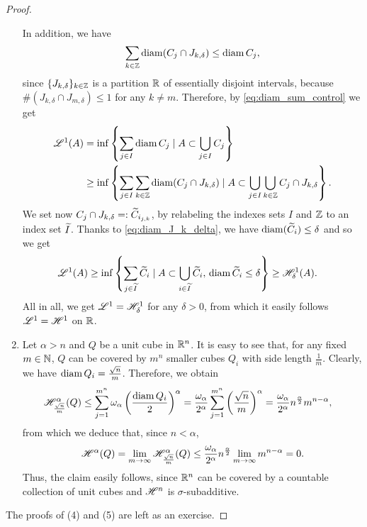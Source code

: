 \begin{proof}
\begin{enumerate}[(1)]
In addition, we have 
\begin{equation} \label{eq:diam_sum_control}
\sum_{k\in\mathbb{Z}} \operatorname{diam}(C_j \cap J_{k,\delta}) \leq \operatorname{diam} C_j,
\end{equation}
since $\{J_{k,\delta}\}_{k \in \mathbb{Z}}$ is a partition $\mathbb{R}$ of essentially disjoint intervals, because $\# (J_{k, \delta} \cap J_{m, \delta}) \le 1$ for any $k \neq m$. Therefore, by \eqref{eq:diam_sum_control} we get
\begin{align*}
\mathscr{L}^{1}(A) & = \inf \left\{ \sum_{j\in I} \operatorname{diam} C_j \mid A \subset
\bigcup_{j\in I} C_j \right\} \\
& \geq \inf \left\{ \sum_{j\in I} \sum_{k\in\mathbb{Z}} \operatorname{diam} (C_j \cap J_{k,\delta}) \mid A \subset
\bigcup_{j\in I} \bigcup_{k\in\mathbb{Z}} C_j\cap J_{k,\delta} \right\}.
\end{align*}
We set now $C_{j} \cap J_{k, \delta} =: \widetilde{ C}_{i_{j, k}}$, by relabeling the indexes sets $I$ and $\mathbb{Z}$ to an index set $\widetilde{ I}$. Thanks to \eqref{eq:diam_J_k_delta}, we have $\operatorname{diam}(\widetilde{ C}_{i}) \le \delta$ and so we get
\begin{align*}
\mathscr{L}^{1}(A) & \ge \inf \left\{ \sum_{j \in \widetilde{ I}} \widetilde{ C}_{i} \mid A \subset \bigcup_{i \in \widetilde{ I}} \widetilde{ C}_{i},\, \operatorname{diam} \widetilde{ C}_i \leq \delta \right\} \geq \mathscr{H}^{1}_\delta(A).
\end{align*}
All in all, we get $\mathscr{L}^{1} = \mathscr{H}^{1}_{\delta}$ for any $\delta > 0$, from which it easily follows $\mathscr{L}^{1} = \mathscr{H}^{1}$ on $\mathbb{R}$.
\item Let $\alpha > n$ and $Q$ be a unit cube in $\mathbb{R}^n$. It is easy to see that, for any fixed $m\in \mathbb{N}$, $Q$ can be covered by $m^{n}$ smaller cubes $Q_i$ with side length $\frac{1}{m}$. Clearly, we have $\operatorname{diam} Q_i
= \frac{\sqrt{n}}{m}$. Therefore, we obtain 
\[
\begin{aligned}
\mathscr{H}^{\alpha}_{\frac{\sqrt{n}}{m}} (Q) 
& \leq \sum_{j=1}^{m^n} \omega_\alpha \left(\frac{\operatorname{diam} Q_i}{2}\right)^\alpha
= \frac{\omega_\alpha}{2^\alpha} \sum_{j=1}^{m^n}
\left(\frac{\sqrt{n}}{m}\right)^\alpha = \frac{\omega_\alpha}{2^\alpha}
n^{\frac{\alpha}{2}} m^{n-\alpha},
\end{aligned}
\]
from which we deduce that, since $n < \alpha$,
\[
\begin{aligned}
\mathscr{H}^{\alpha} (Q) = \lim_{m\to \infty} \mathscr{H}^{\alpha}_{\frac{\sqrt{n}}{m}} (Q) 
\le \frac{\omega_\alpha}{2^\alpha} n^{\frac{\alpha}{2}}
\lim_{m\to \infty} m^{n-\alpha}
= 0.
\end{aligned}
\]
Thus, the claim easily follows, since $\mathbb{R}^n$ can be covered by a countable collection of unit cubes and $\mathscr{H}^{n}$ is $\sigma$-subadditive.
\end{enumerate}
The proofs of (4) and (5) are left as an exercise.
\end{proof}

